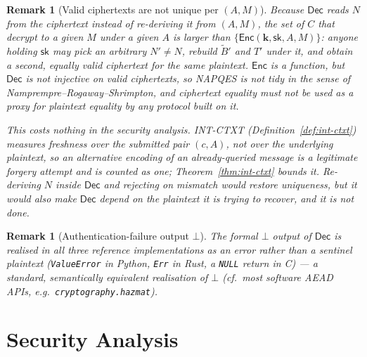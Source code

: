 \documentclass[11pt,a4paper]{article}
\newtheorem{remark}[theorem]{Remark}
\begin{document}
\begin{remark}[Valid ciphertexts are not unique per $(A,M)$]
\label{rem:not-unique}
Because $\mathsf{Dec}$ reads $N$ from the ciphertext instead of re-deriving
it from $(A,M)$, the set of $C$ that decrypt to a given $M$ under a given
$A$ is larger than $\{\mathsf{Enc}(\mathbf{k},\mathsf{sk},A,M)\}$: anyone
holding $\mathsf{sk}$ may pick an arbitrary $N'\neq N$, rebuild
$\widetilde{B}'$ and $T'$ under it, and obtain a second, equally valid
ciphertext for the same plaintext. $\mathsf{Enc}$ is a function, but
$\mathsf{Dec}$ is not injective on valid ciphertexts, so NAPQES is
\emph{not} tidy in the sense of Namprempre--Rogaway--Shrimpton, and
ciphertext equality must not be used as a proxy for plaintext equality by
any protocol built on it.

This costs nothing in the security analysis. INT-CTXT
(Definition~\ref{def:int-ctxt}) measures freshness over the submitted pair
$(c,A)$, not over the underlying plaintext, so an alternative encoding of an
already-queried message is a legitimate forgery attempt and is counted as
one; Theorem~\ref{thm:int-ctxt} bounds it. Re-deriving $N$ inside
$\mathsf{Dec}$ and rejecting on mismatch would restore uniqueness, but it
would also make $\mathsf{Dec}$ depend on the plaintext it is trying to
recover, and it is not done.
\end{remark}

\begin{remark}[Authentication-failure output $\bot$]
The formal $\bot$ output of $\mathsf{Dec}$ is realised in all three
reference implementations as an error rather than a sentinel plaintext
(\texttt{ValueError} in Python, \texttt{Err} in Rust, a \texttt{NULL}
return in C) — a standard, semantically equivalent realisation of $\bot$ (cf.\
most software AEAD APIs, e.g.\ \texttt{cryptography.hazmat}).
\end{remark}

\section{Security Analysis}
\label{sec:security}
\end{document}
